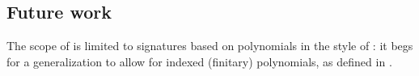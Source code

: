 \documentclass[a4paper]{article}
\begin{document}
\subsection{Future work}

The scope of \cite{Weide2019} is limited to signatures based on polynomials in the style of \cite{Goldblatt2001}: it begs for a generalization to allow for indexed (finitary) polynomials, as defined in \cite{Altenkirch2015}.

\printacronyms
\printbibliography
\end{document}
